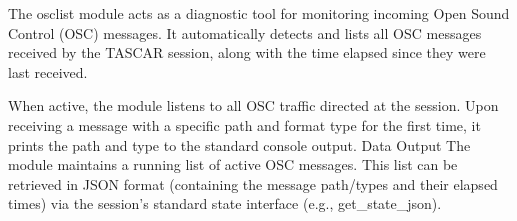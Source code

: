 The osclist module acts as a diagnostic tool for monitoring incoming
Open Sound Control (OSC) messages. It automatically detects and lists
all OSC messages received by the TASCAR session, along with the time
elapsed since they were last received.

When active, the module listens to all OSC traffic directed at the
session. Upon receiving a message with a specific path and format type
for the first time, it prints the path and type to the standard
console output.  Data Output The module maintains a running list of
active OSC messages. This list can be retrieved in JSON format
(containing the message path/types and their elapsed times) via the
session's standard state interface (e.g., get\_state\_json).

